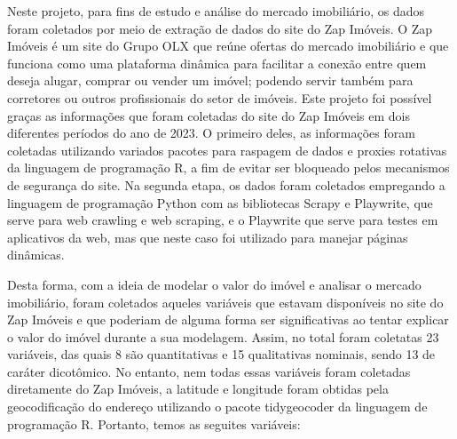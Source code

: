 \documentclass[
  12pt,
  letterpaper,
  DIV=11,
  numbers=noendperiod]{scrreprt}
\begin{document}
Neste projeto, para fins de estudo e análise do mercado imobiliário, os
dados foram coletados por meio de extração de dados do site do Zap
Imóveis. O Zap Imóveis é um site do Grupo OLX que reúne ofertas do
mercado imobiliário e que funciona como uma plataforma dinâmica para
facilitar a conexão entre quem deseja alugar, comprar ou vender um
imóvel; podendo servir também para corretores ou outros profissionais do
setor de imóveis. Este projeto foi possível graças as informações que
foram coletadas do site do Zap Imóveis em dois diferentes períodos do
ano de 2023. O primeiro deles, as informações foram coletadas utilizando
variados pacotes para raspagem de dados e proxies rotativas da linguagem
de programação R, a fim de evitar ser bloqueado pelos mecanismos de
segurança do site. Na segunda etapa, os dados foram coletados empregando
a linguagem de programação Python com as bibliotecas Scrapy e Playwrite,
que serve para web crawling e web scraping, e o Playwrite que serve para
testes em aplicativos da web, mas que neste caso foi utilizado para
manejar páginas dinâmicas.

\vspace{12pt}

Desta forma, com a ideia de modelar o valor do imóvel e analisar o
mercado imobiliário, foram coletados aqueles variáveis que estavam
disponíveis no site do Zap Imóveis e que poderiam de alguma forma ser
significativas ao tentar explicar o valor do imóvel durante a sua
modelagem. Assim, no total foram coletatas 23 variáveis, das quais 8 são
quantitativas e 15 qualitativas nominais, sendo 13 de caráter
dicotômico. No entanto, nem todas essas variáveis foram coletadas
diretamente do Zap Imóveis, a latitude e longitude foram obtidas pela
geocodificação do endereço utilizando o pacote tidygeocoder da linguagem
de programação R. Portanto, temos as seguites variáveis:
\end{document}
